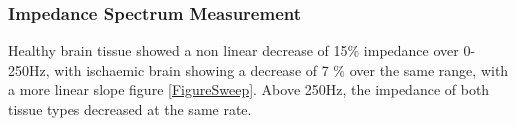 \subsubsection{Impedance Spectrum Measurement}

Healthy brain tissue showed a non linear decrease of 15\% impedance over 0-250Hz, with ischaemic brain showing a decrease of 7 \% over the same range, with a more linear slope figure \ref{FigureSweep}. Above 250Hz, the impedance of both tissue types decreased at the same rate. 